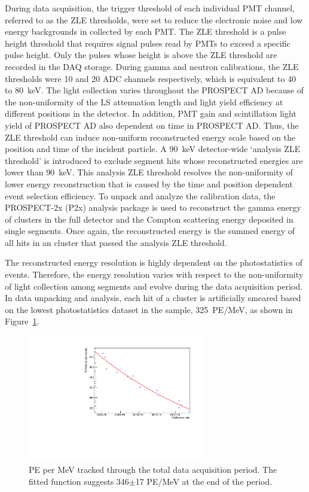 During data acquisition, the trigger threshold of each individual PMT channel, referred to as the ZLE thresholds, were set to reduce the electronic noise and low energy backgrounds in collected by each PMT.
The ZLE threshold is a pulse height threshold that requires signal pulses read by PMTs to exceed a specific pulse height.
Only the pulses whose height is above the ZLE threshold are recorded in the DAQ storage.
During gamma and neutron calibrations, the ZLE thresholds were 10 and 20 ADC channels respectively, which is equivalent to 40 to 80~keV.
The light collection varies throughout the PROSPECT AD because of the non-uniformity of the LS attenuation length and light yield efficiency at different positions in the detector.
In addition, PMT gain and scintillation light yield of PROSPECT AD also dependent on time in PROSPECT AD.
Thus, the ZLE threshold can induce non-uniform reconstructed energy scale based on the position and time of the incident particle.
A 90~keV detector-wide `analysis ZLE threshold' is introduced to exclude segment hits whose reconstructed energies are lower than 90~keV.
This analysis ZLE threshold resolves the non-uniformity of lower energy reconstruction that is caused by the time and position dependent event selection efficiency.
To unpack and analyze the calibration data, the PROSPECT-2x (P2x) analysis package is used to reconstruct the gamma energy of clusters in the full detector and the Compton scattering energy deposited in single segments. 
Once again, the reconstructed energy is the summed energy of all hits in an cluster that passed the analysis ZLE threshold.

The reconstructed energy resolution is highly dependent on the photostatistics of events. 
Therefore, the energy resolution varies with respect to the non-uniformity of light collection among segments and evolve during the data acquisition period.
In data unpacking and analysis, each hit of a cluster is artificially smeared based on the lowest photostatistics dataset in the sample, 325~PE/MeV, as shown in Figure~\ref{fig:PEvTime}.

\begin{figure}[h!]
\centering
\includegraphics[width=0.7\textwidth]{Figures/PEvsTime.pdf}
\caption[The PE per MeV evolution over time]{PE per MeV tracked through the total data acquisition period. The fitted function suggests 346$\pm$17 PE/MeV at the end of the period.}
\label{fig:PEvTime}
\end{figure}

